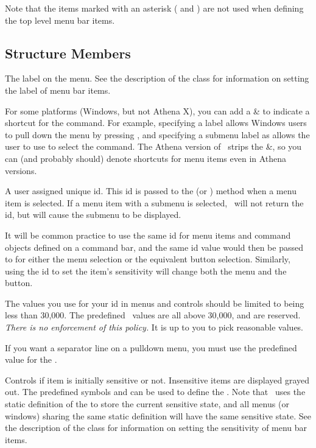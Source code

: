 Note that the items marked with an asterisk ( 
and ) are not used when defining the top 
level menu bar items.

\subsection* {Structure Members}

 The label on the menu.
See the description of the  class for
information on setting the label of menu bar items.

For some platforms (Windows, but not Athena X),
you can add a \& to indicate a shortcut for the command.
For example, specifying a label  allows
Windows users to pull down the  menu
by pressing , and specifying a submenu label as
 allows the user to use  to select
the  command. The Athena version of \V\ strips
the \&, so you can (and probably should) denote shortcuts
for menu items even in Athena versions.

 A user assigned unique id. This id is
passed to the  (or ) method
when a menu item is selected.  If a menu item with a submenu is
selected, \V\ will not return the id, but will cause the submenu
to be displayed.

It will be common practice to use the same id for menu items and
command objects defined on a command bar, and the same id value would then
be passed to  for either the menu selection
or the equivalent button selection. Similarly, using the id to
set the item's sensitivity will change both the menu and the
button.

The values you use for your id in menus and controls should
be limited to being less than 30,000. The predefined
\V\ values are all above 30,000, and are reserved. \emph{
There is no enforcement of this policy.} It is up to you
to pick reasonable values.

If you want a separator line on a pulldown menu, you must use
the predefined value  for the .

 Controls if item is initially sensitive or
not. Insensitive items are displayed grayed out. The predefined
symbols  and  can be used to define
the . Note that \V\ uses the static definition of
the  to store the current sensitive state, and all
menus (or windows) sharing the same static definition will have
the same sensitive state. See the description of the 
class for information on setting the sensitivity of menu bar
items.

